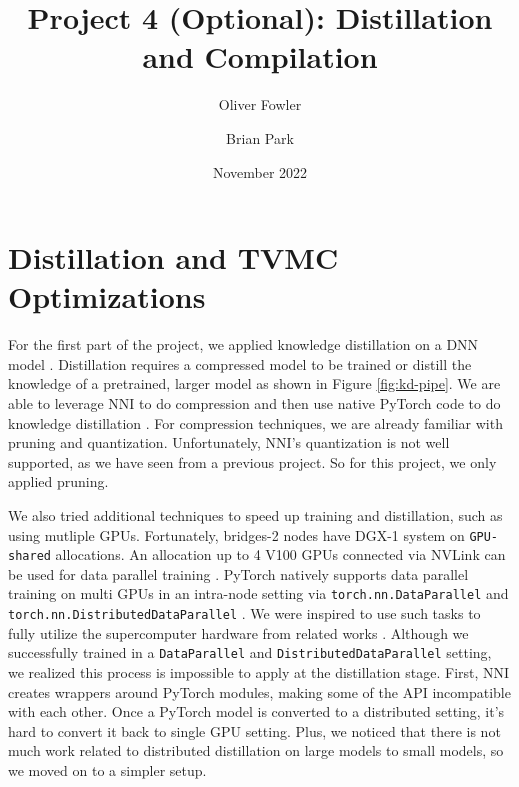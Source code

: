 \documentclass{article}
\title{Project 4 (Optional): Distillation and Compilation}
\author{Oliver Fowler}
\author{Brian Park}
\affil{North Carolina State University, Computer Science 591/791-025}
\date{November 2022}
\begin{document}
\maketitle
%
% 
% 

\section{Distillation and TVMC Optimizations}
For the first part of the project, we applied knowledge distillation on a DNN model \cite{distillation}. Distillation requires a compressed model to be trained or distill the knowledge of a pretrained, larger model as shown in Figure \ref{fig:kd-pipe}. We are able to leverage NNI to do compression and then use native PyTorch code to do knowledge distillation \cite{nni, pytorch}. For compression techniques, we are already familiar with pruning and quantization. Unfortunately, NNI's quantization is not well supported, as we have seen from a previous project. So for this project, we only applied pruning.

We also tried additional techniques to speed up training and distillation, such as using mutliple GPUs. Fortunately, bridges-2 nodes have DGX-1 system on \verb|GPU-shared| allocations. An allocation up to 4 V100 GPUs connected via NVLink can be used for data parallel training \cite{v100}. PyTorch natively supports data parallel training on multi GPUs in an intra-node setting via \verb|torch.nn.DataParallel| and \verb|torch.nn.DistributedDataParallel| \cite{pytorch}. We were inspired to use such tasks to fully utilize the supercomputer hardware from related works \cite{imagenet-quick}. Although we successfully trained in a \verb|DataParallel| and \verb|DistributedDataParallel| setting, we realized this process is impossible to apply at the distillation stage. First, NNI creates wrappers around PyTorch modules, making some of the API incompatible with each other. Once a PyTorch model is converted to a distributed setting, it's hard to convert it back to single GPU setting. Plus, we noticed that there is not much work related to distributed distillation on large models to small models, so we moved on to a simpler setup.
\end{document}

